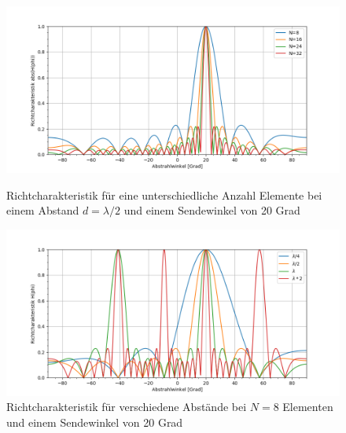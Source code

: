 \begin{figure}[htb]
\begin{center}
\includegraphics[width=\textwidth]{graphics/plot_grundlagen_characteristic_calc_0.png}
\end{center}
\caption{Richtcharakteristik für eine unterschiedliche Anzahl Elemente bei einem Abstand $d = \lambda /2$ und einem Sendewinkel von 20 Grad} %
\label{fig:plot_grundlagen_characteristic_calc_0}
%

\begin{center}
\includegraphics[width=\textwidth]{graphics/plot_grundlagen_characteristic_calc_1.png}
\end{center}
\caption{Richtcharakteristik für verschiedene Abstände bei $N = 8$ Elementen und einem Sendewinkel von 20 Grad} %
\label{fig:plot_grundlagen_characteristic_calc_1}
\end{figure}
%

